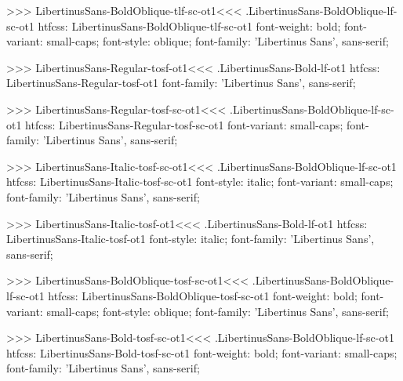 >>>
\<LibertinusSans-BoldOblique-tlf-sc-ot1\><<<
.LibertinusSans-BoldOblique-lf-sc-ot1
htfcss:  LibertinusSans-BoldOblique-tlf-sc-ot1  font-weight: bold; font-variant: small-caps; font-style: oblique; font-family: 'Libertinus Sans', sans-serif;

>>>
\<LibertinusSans-Regular-tosf-ot1\><<<
.LibertinusSans-Bold-lf-ot1
htfcss:  LibertinusSans-Regular-tosf-ot1  font-family: 'Libertinus Sans', sans-serif;

>>>
\<LibertinusSans-Regular-tosf-sc-ot1\><<<
.LibertinusSans-BoldOblique-lf-sc-ot1
htfcss:  LibertinusSans-Regular-tosf-sc-ot1  font-variant: small-caps; font-family: 'Libertinus Sans', sans-serif;

>>>
\<LibertinusSans-Italic-tosf-sc-ot1\><<<
.LibertinusSans-BoldOblique-lf-sc-ot1
htfcss:  LibertinusSans-Italic-tosf-sc-ot1  font-style: italic; font-variant: small-caps; font-family: 'Libertinus Sans', sans-serif;

>>>
\<LibertinusSans-Italic-tosf-ot1\><<<
.LibertinusSans-Bold-lf-ot1
htfcss:  LibertinusSans-Italic-tosf-ot1  font-style: italic; font-family: 'Libertinus Sans', sans-serif;

>>>
\<LibertinusSans-BoldOblique-tosf-sc-ot1\><<<
.LibertinusSans-BoldOblique-lf-sc-ot1
htfcss:  LibertinusSans-BoldOblique-tosf-sc-ot1  font-weight: bold; font-variant: small-caps; font-style: oblique; font-family: 'Libertinus Sans', sans-serif;

>>>
\<LibertinusSans-Bold-tosf-sc-ot1\><<<
.LibertinusSans-BoldOblique-lf-sc-ot1
htfcss:  LibertinusSans-Bold-tosf-sc-ot1  font-weight: bold; font-variant: small-caps; font-family: 'Libertinus Sans', sans-serif;

